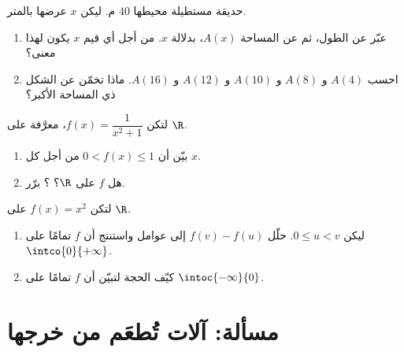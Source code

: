 \begin{exercise}[$\star\star$]\label{exo:g10:functions:8}
حديقة مستطيلة محيطها $40$ م. ليكن $x$ عرضها بالمتر.
\begin{enumerate}
  \item عبّر عن الطول، ثم عن المساحة $A(x)$، بدلالة $x$.
        من أجل أي قيم $x$ يكون لهذا معنى؟
  \item احسب $A(4)$ و $A(8)$ و $A(10)$ و $A(12)$ و $A(16)$. ماذا
        تخمّن عن الشكل ذي المساحة الأكبر؟
\end{enumerate}
\end{exercise}

\begin{exercise}[$\star\star$]\label{exo:g10:functions:9}
لتكن $f(x) = \dfrac{1}{x^2 + 1}$، معرَّفة على $\R$.
\begin{enumerate}
  \item بيّن أن $0 < f(x) \leq 1$ من أجل كل  $x$.
  \item هل  $f$  على $\R$؟ ؟ برّر.
\end{enumerate}
\end{exercise}

\begin{exercise}[$\star\star\star$]\label{exo:g10:functions:10}
لتكن $f(x) = x^2$ على $\R$.
\begin{enumerate}
  \item ليكن $0 \leq u < v$. حلّل $f(v) - f(u)$ إلى عوامل واستنتج أن $f$
         تمامًا على $\intco{0}{+\infty}$.
  \item كيّف الحجة لتبيّن أن $f$  تمامًا على
        $\intoc{-\infty}{0}$.
\end{enumerate}
\end{exercise}

\section{مسألة: آلات تُطعَم من خرجها}

